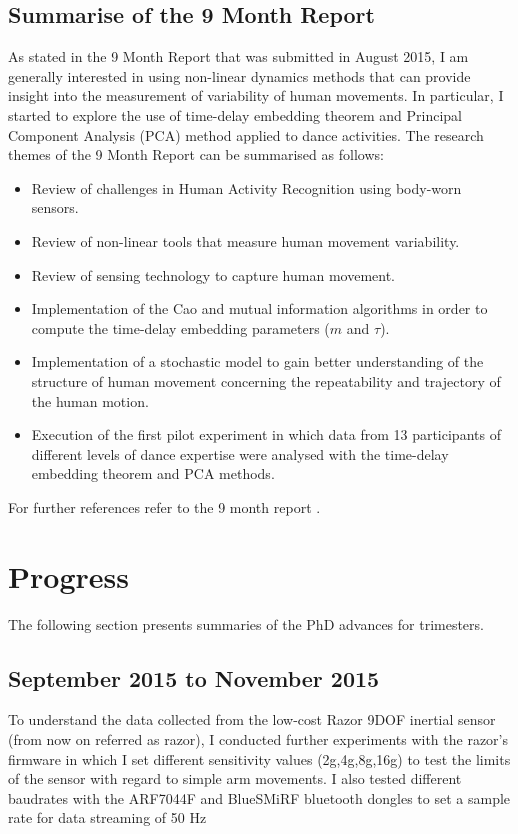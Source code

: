 \documentclass[9pt,journal,onecolumn,compsoc]{IEEEtran}
\begin{document}
\subsection{Summarise of the 9 Month Report}
As stated in the 9 Month Report that was submitted in August 2015,
I am generally interested in using non-linear dynamics methods 
that can provide insight into the measurement of variability of human movements.
In particular, I started to explore the use of time-delay embedding theorem and 
Principal Component Analysis (PCA) method applied to dance activities. 
The research themes of the 9 Month Report can be summarised as follows:

\begin{itemize}
 \item Review of challenges in Human Activity Recognition using body-worn sensors.
 \item Review of non-linear tools that measure human movement variability.
 \item Review of sensing technology to capture human movement.
 \item Implementation of the Cao and mutual information algorithms in order 
    to compute the time-delay embedding parameters ($m$ and $\tau$).
 \item Implementation of a stochastic model to gain better understanding of the 
 structure of human movement concerning 
 the repeatability and trajectory of the human motion.
 \item Execution of the first pilot experiment in which data from 13 participants of different 
 levels of dance expertise were analysed with the time-delay embedding theorem and PCA methods.
\end{itemize}

For further references refer to the 9 month report \cite{mxochicale_9monthreport}.

\section{Progress}

The following section presents summaries of the PhD advances for trimesters.

\subsection{September 2015 to November 2015}

To understand the data collected from the low-cost Razor 9DOF inertial sensor
(from now on referred as razor),
I conducted further experiments with the razor's firmware in which I set 
different sensitivity values (2g,4g,8g,16g) to test the limits of the sensor
with regard to simple arm movements.
I also tested different baudrates with the ARF7044F and BlueSMiRF bluetooth dongles 
to set a sample rate for data streaming of 50 Hz
\end{document}
